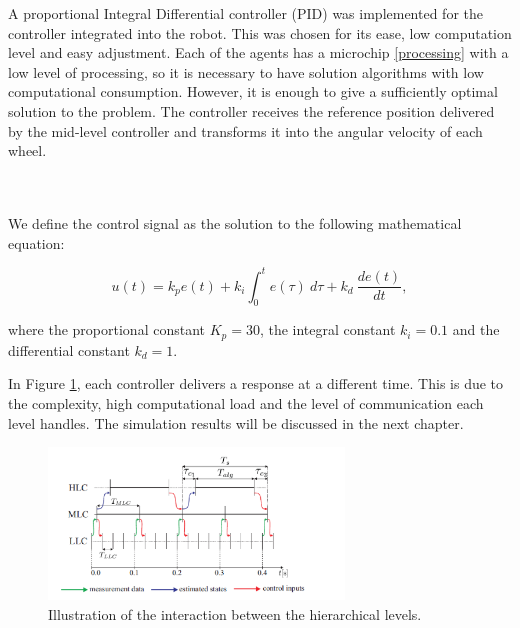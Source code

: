 A proportional Integral Differential controller (PID) was implemented for the controller integrated into the robot. This was chosen for its ease, low computation level and easy adjustment. Each of the agents has a microchip \ref{processing} with a low level of processing, so it is necessary to have solution algorithms with low computational consumption. However, it is enough to give a sufficiently optimal solution to the problem. The controller receives the reference position delivered by the mid-level controller and transforms it into the angular velocity of each wheel.

\\
\\

We define the control signal as the solution to the following mathematical equation:

\begin{equation}
    u(t)= k_p e(t)+k_i \int_0^t e(\tau)\ d\tau + k_d \ \frac{d e(t)}{dt},
\end{equation}

where the proportional constant $K_p = 30$, the integral constant $k_i = 0.1$ and the differential constant $k_d = 1$.



 In Figure \ref{times}, each controller delivers a response at a different time. This is due to the complexity, high computational load and the level of communication each level handles. The simulation results will be discussed in the next chapter.

\begin{figure}[H]
\centering
    \includegraphics[width=0.7\textwidth]{Kap4/tiempos.png}
    \caption{Illustration of the interaction between the hierarchical levels.}
    \label{times}
\end{figure}